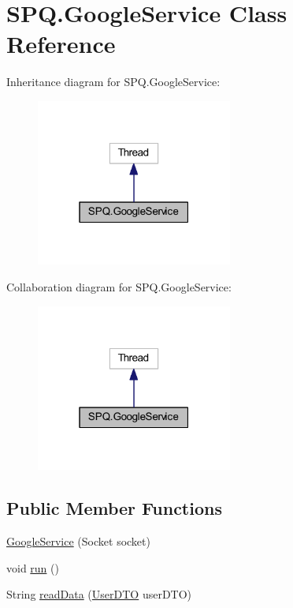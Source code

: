 \hypertarget{class_s_p_q_1_1_google_service}{}\section{S\+P\+Q.\+Google\+Service Class Reference}
\label{class_s_p_q_1_1_google_service}


Inheritance diagram for S\+P\+Q.\+Google\+Service\+:
\nopagebreak
\begin{figure}[H]
\begin{center}
\leavevmode
\includegraphics[width=183pt]{class_s_p_q_1_1_google_service__inherit__graph}
\end{center}
\end{figure}


Collaboration diagram for S\+P\+Q.\+Google\+Service\+:
\nopagebreak
\begin{figure}[H]
\begin{center}
\leavevmode
\includegraphics[width=183pt]{class_s_p_q_1_1_google_service__coll__graph}
\end{center}
\end{figure}
\subsection*{Public Member Functions}
\begin{DoxyCompactItemize}
\item 
\mbox{\hyperlink{class_s_p_q_1_1_google_service_aa585d2611aa3d84e9cdbc67609207c99}{Google\+Service}} (Socket socket)
\item 
void \mbox{\hyperlink{class_s_p_q_1_1_google_service_aecd41a7e761dc392fc96e096547dc504}{run}} ()
\item 
String \mbox{\hyperlink{class_s_p_q_1_1_google_service_a94e224618cc0433776bcb49bff80067f}{read\+Data}} (\mbox{\hyperlink{class_s_p_q_1_1dto_1_1_user_d_t_o}{User\+D\+TO}} user\+D\+TO)
\end{DoxyCompactItemize}


